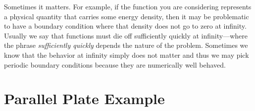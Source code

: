Sometimes it matters. For example, if the function you are considering represents a physical quantity that carries some energy density, then it may be problematic to have a boundary condition where that density does not go to zero at infinity. Usually we say that functions must die off sufficiently quickly at infinity---where the phrase \emph{sufficiently quickly} depends the nature of the problem. Sometimes we know that the behavior at infinity simply does not matter and thus we may pick periodic boundary conditions because they are numerically well behaved.

\section{Parallel Plate Example}

